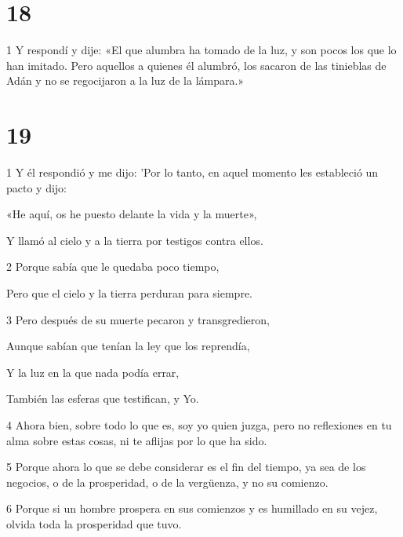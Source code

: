 \chapter{18}

\par 1 Y respondí y dije: «El que alumbra ha tomado de la luz, y son pocos los que lo han imitado. Pero aquellos a quienes él alumbró, los sacaron de las tinieblas de Adán y no se regocijaron a la luz de la lámpara.»

\chapter{19}

\par 1 Y él respondió y me dijo: 'Por lo tanto, en aquel momento les estableció un pacto y dijo:

\par «He aquí, os he puesto delante la vida y la muerte»,

\par Y llamó al cielo y a la tierra por testigos contra ellos.

\par 2 Porque sabía que le quedaba poco tiempo,

\par Pero que el cielo y la tierra perduran para siempre.

\par 3 Pero después de su muerte pecaron y transgredieron,

\par Aunque sabían que tenían la ley que los reprendía,

\par Y la luz en la que nada podía errar,

\par También las esferas que testifican, y Yo.

\par 4 Ahora bien, sobre todo lo que es, soy yo quien juzga, pero no reflexiones en tu alma sobre estas cosas, ni te aflijas por lo que ha sido.

\par 5 Porque ahora lo que se debe considerar es el fin del tiempo, ya sea de los negocios, o de la prosperidad, o de la vergüenza, y no su comienzo.

\par 6 Porque si un hombre prospera en sus comienzos y es humillado en su vejez, olvida toda la prosperidad que tuvo.

